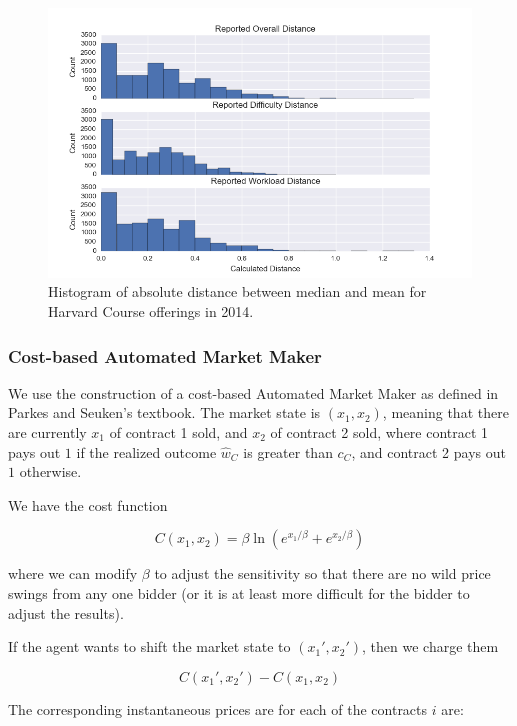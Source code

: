 \begin{figure}[h!]
\centering
\includegraphics[scale=0.5]{distance}
\caption{Histogram of absolute distance between median and mean for Harvard Course offerings in 2014.}
\label{fig:distance}
\end{figure}

\subsubsection{Cost-based Automated Market Maker}
\label{sec:simple_maker}
We use the construction of a cost-based Automated Market Maker as defined in Parkes and Seuken's textbook. \cite{textbook} The market state is $(x_1, x_2)$, meaning that there are currently $x_1$ of contract 1 sold, and $x_2$ of contract 2 sold, where contract 1 pays out $1$ if the realized outcome $\hat{w}_C$ is greater than $c_C$, and contract 2 pays out $1$ otherwise.  

We have the cost function

\begin{equation}
C(x_1, x_2) = \beta\ln(e^{x_1/\beta}+ e^{x_2/\beta})\label{eq:costfun}
\end{equation}


where we can modify $\beta$ to adjust the sensitivity so that there are no wild price swings from any one bidder (or it is at least more difficult for the bidder to adjust the results). 

If the agent wants to shift the market state to $(x_1', x_2')$, then we charge them 

\[ C(x_1', x_2') - C(x_1, x_2)\]


The corresponding instantaneous prices are for each of the contracts $i$ are:

